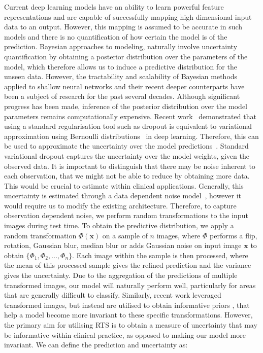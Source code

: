\documentclass[3p]{elsarticle}
\begin{document}
Current deep learning models have an ability to learn powerful feature representations and are capable of successfully mapping high dimensional input data to an output. However, this mapping is assumed to be accurate in such models and there is no quantification of how certain the model is of the prediction. Bayesian approaches to modeling, naturally involve uncertainty quantification by obtaining a posterior distribution over the parameters of the model, which therefore allows us to induce a predictive distribution for the unseen data. However, the tractability and scalability of Bayesian methods applied to shallow neural networks and their recent deeper counterparts have been a subject of research for the past several decades. Although significant progress has been made, inference of the posterior distribution over the model parameters remains computationally expensive. Recent work~\citep{gal2016dropout} demonstrated that using a standard regularisation tool such as dropout is equivalent to variational approximation using Bernoulli distributions~\citep{bishop2012pattern} in deep learning. Therefore, this can be used to approximate the uncertainty over the model predictions~\citep{Gal2016Uncertainty}. Standard variational dropout captures the uncertainty over the model weights, given the observed data. It is important to distinguish that there may be noise inherent to each observation, that we might not be able to reduce by obtaining more data. This would be crucial to estimate within clinical applications. Generally, this uncertainty is estimated through a data dependent noise model~\citep{kendall2017uncertainties}, however it would require us to modify the existing architecture. Therefore, to capture observation dependent noise, we perform random transformations to the input images during test time. To obtain the predictive distribution, we apply a random transformation $\Phi(\textbf{x})$ on a sample of $n$ images, where $\Phi$ performs a flip, rotation, Gaussian blur, median blur or adds Gaussian noise on input image $\textbf{x}$ to obtain $\{\Phi_1, \Phi_2, ... , \Phi_n\}$. Each image within the sample is then processed, where the mean of this processed sample gives the refined prediction and the variance gives the uncertainty. Due to the aggregation of the predictions of multiple transformed images, our model will naturally perform well, particularly for areas that are generally difficult to classify. Similarly, recent work leveraged transformed images, but instead are utilised to obtain informative priors \citep{nalisnick2018learning}, that help a model become more invariant to these specific transformations. However, the primary aim for utilising RTS is to obtain a measure of uncertainty that may be informative within clinical practice, as opposed to making our model more invariant. We can define the prediction and uncertainty as:
\end{document}
